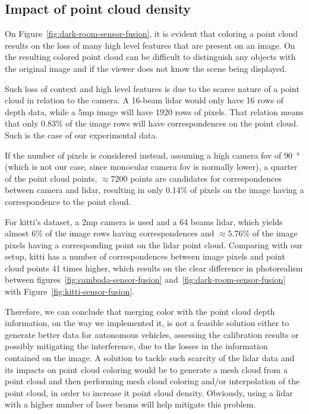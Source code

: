 \subsection{Impact of point cloud density}
On Figure~\ref{fig:dark-room-sensor-fusion}, it is evident that coloring a point cloud results on the loss of many high level features that are present on an image. On the resulting colored point cloud can be difficult to distinguish any objects with the original image and if the viewer does not know the scene being displayed.

Such loss of context and high level features is due to the scarce nature of a point cloud in relation to the camera. A 16-beam \ac{lidar} would only have 16 rows of depth data, while a 5\ac{mp} image will have 1920 rows of pixels. That relation means that only 0.83\% of the image rows will have correspondences on the point cloud. Such is the case of our experimental data.

If the number of pixels is considered instead, assuming a high camera \ac{fov} of \SI{90}{\degree} (which is not our case, since monocular camera \ac{fov} is normally lower), a quarter of the point cloud points, $\approx 7200$ points are candidates for correspondences between camera and \ac{lidar}, resulting in only 0.14\% of pixels on the image having a correspondence to the point cloud. 

For \ac{kitti}'s dataset, a 2\ac{mp} camera is used and a 64 beams \ac{lidar}, which yields almost 6\% of the image rows having correspondences and $\approx 5.76\%$ of the image pixels having a corresponding point on the \ac{lidar} point cloud. Comparing with our setup, \ac{kitti} has a number of correspondences between image pixels and point cloud points 41 times higher, which results on the clear difference in photorealism between figures~\ref{fig:cambada-sensor-fusion} and~\ref{fig:dark-room-sensor-fusion} with Figure~\ref{fig:kitti-sensor-fusion}.

Therefore, we can conclude that merging color with the point cloud depth information, on the way we implemented it, is not a feasible solution either to generate better data for autonomous vehicles, assessing the calibration results or possibly mitigating the interference, due to the losses in the information contained on the image. A solution to tackle such scarcity of the \ac{lidar} data and its impacts on point cloud coloring would be to generate a mesh cloud  from a point cloud and then performing mesh cloud coloring and/or interpolation of the point cloud, in order to increase it point cloud density. Obviously, using a \ac{lidar} with a higher number of laser beams will help mitigate this problem.

